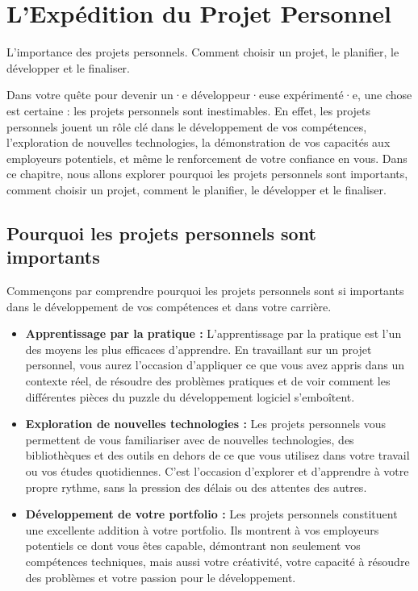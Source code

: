 \chapter{L'Expédition du Projet Personnel}
L'importance des projets personnels. Comment choisir un projet, le planifier, le développer et le finaliser.

Dans votre quête pour devenir un·e développeur·euse expérimenté·e, une chose est certaine : les projets personnels sont inestimables. En effet, les projets personnels jouent un rôle clé dans le développement de vos compétences, l'exploration de nouvelles technologies, la démonstration de vos capacités aux employeurs potentiels, et même le renforcement de votre confiance en vous. Dans ce chapitre, nous allons explorer pourquoi les projets personnels sont importants, comment choisir un projet, comment le planifier, le développer et le finaliser.

\section{Pourquoi les projets personnels sont importants}

Commençons par comprendre pourquoi les projets personnels sont si importants dans le développement de vos compétences et dans votre carrière.

\begin{itemize}
    \item \textbf{Apprentissage par la pratique :} L'apprentissage par la pratique est l'un des moyens les plus efficaces d'apprendre. En travaillant sur un projet personnel, vous aurez l'occasion d'appliquer ce que vous avez appris dans un contexte réel, de résoudre des problèmes pratiques et de voir comment les différentes pièces du puzzle du développement logiciel s'emboîtent.

    \item \textbf{Exploration de nouvelles technologies :} Les projets personnels vous permettent de vous familiariser avec de nouvelles technologies, des bibliothèques et des outils en dehors de ce que vous utilisez dans votre travail ou vos études quotidiennes. C'est l'occasion d'explorer et d'apprendre à votre propre rythme, sans la pression des délais ou des attentes des autres.

    \item \textbf{Développement de votre portfolio :} Les projets personnels constituent une excellente addition à votre portfolio. Ils montrent à vos employeurs potentiels ce dont vous êtes capable, démontrant non seulement vos compétences techniques, mais aussi votre créativité, votre capacité à résoudre des problèmes et votre passion pour le développement.
\end{itemize}

